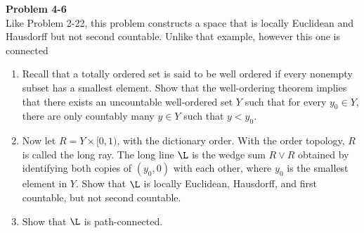 \documentclass[12pt, a4paper]{article}
\theoremstyle{plain}
\newenvironment{problem}[2][Problem]
    { \begin{mdframed}[backgroundcolor=gray!20] \textbf{#1 #2} \\}
    {  \end{mdframed}}
\begin{document}
\begin{problem}{4-6}
Like Problem 2-22, this problem constructs a space that is locally Euclidean and Hausdorff but not second countable. Unlike that example, however this one is connected
\begin{enumerate}[label=(\alph*)]
\item Recall that a totally ordered set is said to be well ordered if every nonempty subset has a smallest element. Show that the well-ordering theorem implies that there exists an uncountable well-ordered set $Y$ such that for every $y_0\in Y$, there are only countably many $y\in Y$ such that $y<y_0$.

\item Now let $R=Y\times [0,1)$, with the dictionary order. With the order topology, $R$ is called the long ray. The long line $\L$ is the wedge sum $R\vee R$ obtained by identifying both copies of $(y_0,0)$ with each other, where $y_0$ is the smallest element in $Y$. Show that $\L$ is locally Euclidean, Hausdorff, and first countable, but not second countable.

\item Show that $\L$ is path-connected. 
\end{enumerate}
\end{problem}
\end{document}
